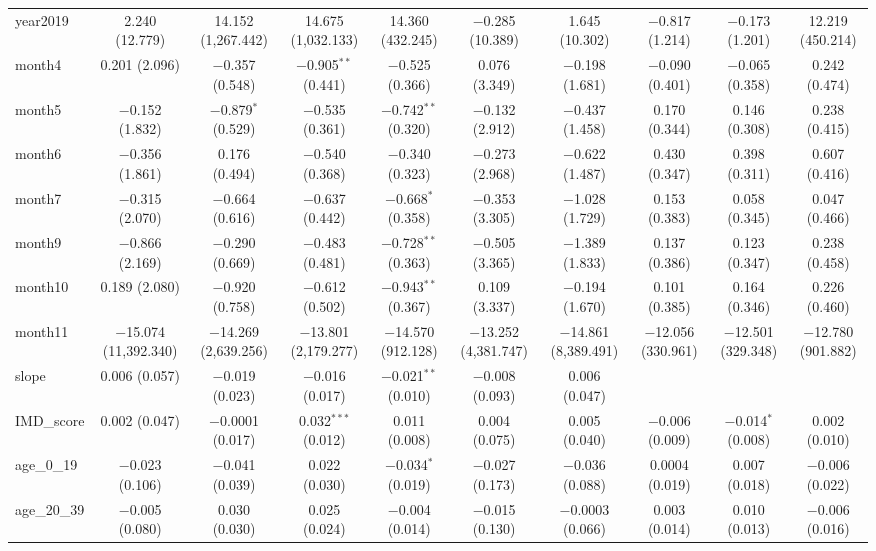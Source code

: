 \begin{table}[!htbp]
\begin{tabular}{@{\extracolsep{1pt}}lccccccccc}
  year2019 & 2.240 (12.779) & 14.152 (1,267.442) & 14.675 (1,032.133) & 14.360 (432.245) & $-$0.285 (10.389) & 1.645 (10.302) & $-$0.817 (1.214) & $-$0.173 (1.201) & 12.219 (450.214) \\ 
  month4 & 0.201 (2.096) & $-$0.357 (0.548) & $-$0.905$^{**}$ (0.441) & $-$0.525 (0.366) & 0.076 (3.349) & $-$0.198 (1.681) & $-$0.090 (0.401) & $-$0.065 (0.358) & 0.242 (0.474) \\ 
  month5 & $-$0.152 (1.832) & $-$0.879$^{*}$ (0.529) & $-$0.535 (0.361) & $-$0.742$^{**}$ (0.320) & $-$0.132 (2.912) & $-$0.437 (1.458) & 0.170 (0.344) & 0.146 (0.308) & 0.238 (0.415) \\ 
  month6 & $-$0.356 (1.861) & 0.176 (0.494) & $-$0.540 (0.368) & $-$0.340 (0.323) & $-$0.273 (2.968) & $-$0.622 (1.487) & 0.430 (0.347) & 0.398 (0.311) & 0.607 (0.416) \\ 
  month7 & $-$0.315 (2.070) & $-$0.664 (0.616) & $-$0.637 (0.442) & $-$0.668$^{*}$ (0.358) & $-$0.353 (3.305) & $-$1.028 (1.729) & 0.153 (0.383) & 0.058 (0.345) & 0.047 (0.466) \\ 
  month9 & $-$0.866 (2.169) & $-$0.290 (0.669) & $-$0.483 (0.481) & $-$0.728$^{**}$ (0.363) & $-$0.505 (3.365) & $-$1.389 (1.833) & 0.137 (0.386) & 0.123 (0.347) & 0.238 (0.458) \\ 
  month10 & 0.189 (2.080) & $-$0.920 (0.758) & $-$0.612 (0.502) & $-$0.943$^{**}$ (0.367) & 0.109 (3.337) & $-$0.194 (1.670) & 0.101 (0.385) & 0.164 (0.346) & 0.226 (0.460) \\ 
  month11 & $-$15.074 (11,392.340) & $-$14.269 (2,639.256) & $-$13.801 (2,179.277) & $-$14.570 (912.128) & $-$13.252 (4,381.747) & $-$14.861 (8,389.491) & $-$12.056 (330.961) & $-$12.501 (329.348) & $-$12.780 (901.882) \\ 
  slope & 0.006 (0.057) & $-$0.019 (0.023) & $-$0.016 (0.017) & $-$0.021$^{**}$ (0.010) & $-$0.008 (0.093) & 0.006 (0.047) &  &  &  \\ 
  IMD\_score & 0.002 (0.047) & $-$0.0001 (0.017) & 0.032$^{***}$ (0.012) & 0.011 (0.008) & 0.004 (0.075) & 0.005 (0.040) & $-$0.006 (0.009) & $-$0.014$^{*}$ (0.008) & 0.002 (0.010) \\ 
  age\_0\_19 & $-$0.023 (0.106) & $-$0.041 (0.039) & 0.022 (0.030) & $-$0.034$^{*}$ (0.019) & $-$0.027 (0.173) & $-$0.036 (0.088) & 0.0004 (0.019) & 0.007 (0.018) & $-$0.006 (0.022) \\ 
  age\_20\_39 & $-$0.005 (0.080) & 0.030 (0.030) & 0.025 (0.024) & $-$0.004 (0.014) & $-$0.015 (0.130) & $-$0.0003 (0.066) & 0.003 (0.014) & 0.010 (0.013) & $-$0.006 (0.016) \\ 

\end{tabular}
\end{table}
